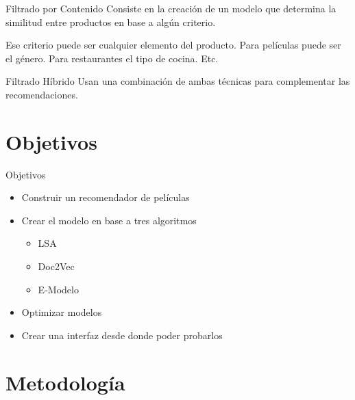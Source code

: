 \documentclass[table]{beamer}
\begin{document}
  \begin{frame}{Filtrado por Contenido}
      Consiste en la creación de un modelo que determina la similitud entre productos en base a algún criterio.

      Ese criterio puede ser cualquier elemento del producto. Para películas puede ser el género. Para restaurantes el tipo de cocina. Etc.
  \end{frame}

  \begin{frame}{Filtrado Híbrido}
      Usan una combinación de ambas técnicas para complementar las recomendaciones.
  \end{frame}

  \section{Objetivos}

  \begin{frame}{Objetivos}
      \begin{itemize}
          \item Construir un recomendador de películas
          \item Crear el modelo en base a tres algoritmos
              \begin{itemize}
                  \item LSA
                  \item Doc2Vec
                  \item E-Modelo
              \end{itemize}
          \item Optimizar modelos
          \item Crear una interfaz desde donde poder probarlos
      \end{itemize}
  \end{frame}

  \section{Metodología}
\end{document}
